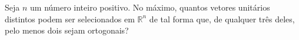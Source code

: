 Seja \(n\) um número inteiro positivo. No máximo, quantos vetores unitários distintos podem ser selecionados em \(\mathbb{R}^n\) de tal forma que, de qualquer três deles, pelo menos dois sejam ortogonais?
